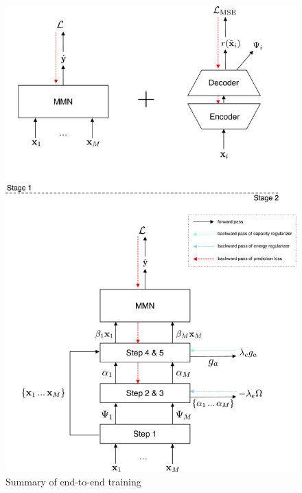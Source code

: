 \newpage
\null
\vfill
\begin{center}
\begin{figure}[!h]
\centering
\includegraphics[scale=0.5]{figures/summary-training}
\caption{Summary of end-to-end training}	
\label{fig:training}
\end{figure}
\end{center}
\vfill
\clearpage